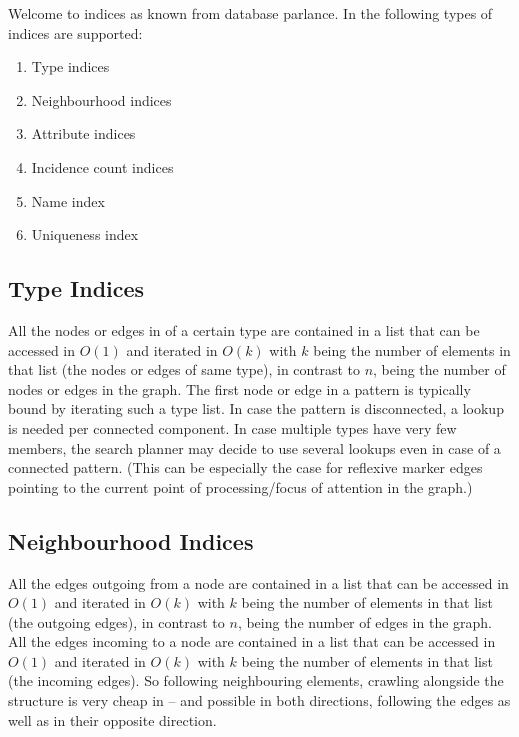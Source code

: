 Welcome to indices as known from database parlance.
In \GrG{} the following types of indices are supported:
\begin{enumerate}
	\item Type indices
	\item Neighbourhood indices
	\item Attribute indices
	\item Incidence count indices
	\item Name index
	\item Uniqueness index
\end{enumerate}

\subsection{Type Indices}
All the nodes or edges in \GrG{} of a certain type are contained in a list that can be accessed in $O(1)$ and iterated in $O(k)$ with $k$ being the number of elements in that list (the nodes or edges of same type), in contrast to $n$, being the number of nodes or edges in the graph.
The first node or edge in a pattern is typically bound by iterating such a type list.
In case the pattern is disconnected, a lookup is needed per connected component.
In case multiple types have very few members, the search planner may decide to use several lookups even in case of a connected pattern.
(This can be especially the case for reflexive marker edges pointing to the current point of processing/focus of attention in the graph.)

\subsection{Neighbourhood Indices}
All the edges outgoing from a node are contained in a list that can be accessed in $O(1)$ and iterated in $O(k)$ with $k$ being the number of elements in that list (the outgoing edges), in contrast to $n$, being the number of edges in the graph.
All the edges incoming to a node are contained in a list that can be accessed in $O(1)$ and iterated in $O(k)$ with $k$ being the number of elements in that list (the incoming edges).
So following neighbouring elements, crawling alongside the structure is very cheap in \GrG{ } -- and possible in both directions, following the edges as well as in their opposite direction.

